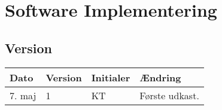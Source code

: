 \chapter{Software Implementering} \label{ch:SwImpl}
\section{Version}
\begin{table}[h]
	\centering
	\begin{tabularx}{\textwidth - 2cm}{|l|l|l|X|}
	\hline
	Dato	& Version	& Initialer & Ændring	\\ \hline
	7. maj & 1 & KT & Første udkast. \\ \hline 
	\end{tabularx}
\end{table}

